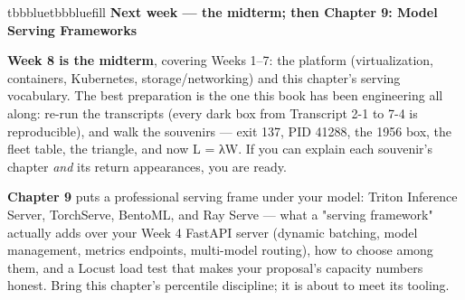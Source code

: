 \vspace{5.0pt}

\begin{calloutbox}{tbbblue}{tbbbluefill}
{\normalsize\bfseries\color{tbbblue}Next week — the midterm; then Chapter 9: Model Serving Frameworks}\par\vspace{3pt}
\textbf{Week 8 is the midterm}, covering Weeks 1–7: the platform (virtualization, containers, Kubernetes, storage/networking) and this chapter's serving vocabulary. The best preparation is the one this book has been engineering all along: re-run the transcripts (every dark box from Transcript 2-1 to 7-4 is reproducible), and walk the souvenirs — exit 137, PID 41288, the 1956 box, the fleet table, the triangle, and now L = λW. If you can explain each souvenir's chapter \textit{and} its return appearances, you are ready.

\textbf{Chapter 9} puts a professional serving frame under your model: Triton Inference Server, TorchServe, BentoML, and Ray Serve — what a "serving framework" actually adds over your Week 4 FastAPI server (dynamic batching, model management, metrics endpoints, multi-model routing), how to choose among them, and a Locust load test that makes your proposal's capacity numbers honest. Bring this chapter's percentile discipline; it is about to meet its tooling.
\end{calloutbox}
